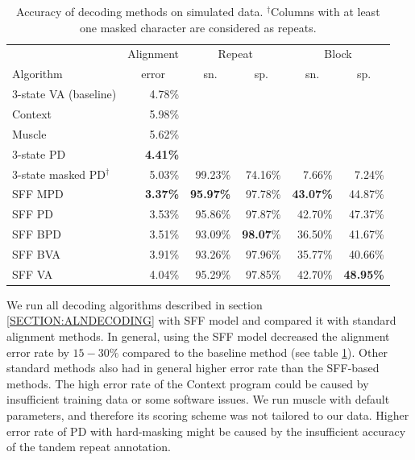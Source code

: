 \def\M{$^\circ$} %
\def\MM{$^{\circ\circ\circ}$} %
\def\D{$^{\circ\circ}$} %
\def\DD{$^{\dagger}$} %
\def\R{$^{\yen}$}
\def\RR{$^{\yen\yen}$}
\def\CC#1{\multicolumn{1}{c}{#1}} %
\def\S{$^{\star}$}

\begin{table}
\begin{center}
\begin{tabular}{lr@{\quad}rr@{\quad}rr}
\hline
          & \CC{Alignment} & \multicolumn{2}{c}{Repeat} & 
\multicolumn{2}{c}{Block}\\
Algorithm & \CC{error} & \CC{sn.} & \CC{sp.} & \CC{sn.} & \CC{sp.} \\
\hline
\hline
3-state VA (baseline)    & 4.78\% \\
Context             & 5.98\% \\
Muscle              & 5.62\% \\
3-state PD   & \bf 4.41\% \\
3-state masked PD\DD & 5.03\% & 99.23\% & 74.16\% & 7.66\% & 7.24\%\\
\hline
SFF MPD   & {\bf 3.37\%} & {\bf 95.97\%} & 97.78\% & {\bf 43.07\%} & 44.87\%\\
SFF PD    & 3.53\% & 95.86\% & 97.87\% & 42.70\% & 47.37\%\\
SFF BPD   & 3.51\% & 93.09\% & {\bf 98.07}\% & 36.50\% & 41.67\%\\
SFF BVA   & 3.91\% & 93.26\% & 97.96\% & 35.77\% & 40.66\%\\
SFF VA    & 4.04\% & 95.29\% & 97.85\% & 42.70\% & {\bf 48.95\%}\\
\hline
\end{tabular}
\end{center}
\caption[Comparison of the SFF methods]{Accuracy of decoding methods on simulated data. \DD Columns with at
    least one masked character are considered as repeats.
}\label{TABLE:SFFMAIN}
\end{table}

We run all decoding algorithms described in section \ref{SECTION:ALNDECODING} with SFF model
and compared it with standard alignment methods. 
In general, using the SFF model decreased the alignment error rate by $15-30\%$
compared to the baseline method (see table \ref{TABLE:SFFMAIN}). Other standard
methods also had in general higher error rate than the SFF-based methods.  The
high error rate of the Context program could be caused by insufficient training
data or some software issues. We run muscle with default parameters, and
therefore its scoring scheme was not tailored to our data.  Higher error rate
of PD with hard-masking might be caused by the insufficient accuracy of the
tandem repeat annotation.

